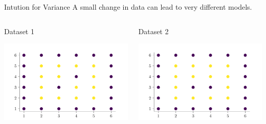 \documentclass[usenames,dvipsnames]{beamer}
\begin{document}
\begin{frame}{Intution for Variance}
A small change in data can lead to very different models.\\
\vspace{1cm}
\begin{columns}
\begin{column}{0.5\textwidth}{\hspace{1.75cm} Dataset 1}
\begin{center}
\includegraphics[width = \textwidth]{../assets/bias-variance/figures/bias-variance-dataset-2.pdf}
\end{center}
\end{column}
\begin{column}{0.5\textwidth}{\hspace{1.75cm} Dataset 2}
\begin{center}
\includegraphics[width = \textwidth]{../assets/bias-variance/figures/bias-variance-dataset-2-2.pdf}
\end{center}
\end{column}
\end{columns}
\end{frame}
\end{document}
